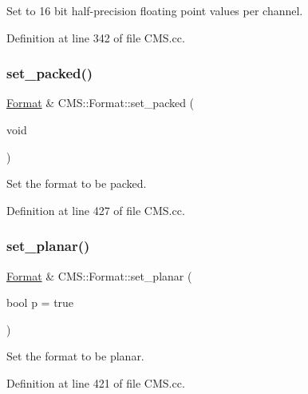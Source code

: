 Set to 16 bit half-\/precision floating point values per channel. 



Definition at line 342 of file C\+M\+S.\+cc.

\mbox{\label{class_c_m_s_1_1_format_ac084e9e34867955fe2d72d28f88a13fd}} 
\subsubsection{\texorpdfstring{set\+\_\+packed()}{set\_packed()}}
{\footnotesize\ttfamily \hyperlink{class_c_m_s_1_1_format}{Format} \& C\+M\+S\+::\+Format\+::set\+\_\+packed (\begin{DoxyParamCaption}\item[{void}]{ }\end{DoxyParamCaption})}



Set the format to be packed. 



Definition at line 427 of file C\+M\+S.\+cc.

\mbox{\label{class_c_m_s_1_1_format_a08b6f3cfa807eeacd4b15d1d315577a5}} 
\subsubsection{\texorpdfstring{set\+\_\+planar()}{set\_planar()}}
{\footnotesize\ttfamily \hyperlink{class_c_m_s_1_1_format}{Format} \& C\+M\+S\+::\+Format\+::set\+\_\+planar (\begin{DoxyParamCaption}\item[{bool}]{p = {\ttfamily true} }\end{DoxyParamCaption})}



Set the format to be planar. 



Definition at line 421 of file C\+M\+S.\+cc.

\mbox{\label{class_c_m_s_1_1_format_a59efd2fff84010ad80602892a4e71a67}} 
